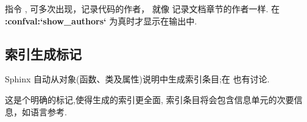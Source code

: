 \documentclass[letterpaper,10pt,english]{sphinxmanual}
\begin{document}
\begin{fulllineitems}
\label{markup/misc:directive-codeauthor}
指令 {\hyperref[markup/misc:directive\string-codeauthor]{}} , 可多次出现，记录代码的作者，
就像 {\hyperref[markup/misc:directive\string-sectionauthor]{}} 记录文档章节的作者一样.
在 {\color{red}\bfseries{}:confval:{}`show\_authors{}`} 为真时才显示在输出中.

\end{fulllineitems}



\subsection{索引生成标记}
\label{markup/misc:id8}
Sphinx 自动从对象(函数、类及属性)说明中生成索引条目;在 {\hyperref[domains:domains]{}} 也有讨论.

这是个明确的标记,使得生成的索引更全面, 索引条目将会包含信息单元的次要信息，如语言参考.
\end{document}
